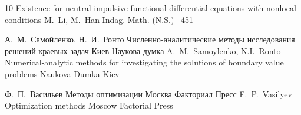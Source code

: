 \begin{thebibliography}{10}
\paper Existence for neutral impulsive functional differential equations with nonlocal conditions
\by   M.~Li,  M.~Han
\jour Indag. Math. (N.S.)
--451


\by А.~М.~Самойленко, Н.~И.~Ронто
\book Численно-аналитические методы исследования решений краевых задач
\publaddr Киев
\publ Наукова думка
\misctransl
\by A.~M.~Samoylenko, N.I.~Ronto
\book Numerical-analytic methods for investigating the solutions of boundary value problems
\publ Naukova Dumka
\publaddr Kiev

\by Ф.~П.~Васильев 
\book Методы оптимизации
\publaddr Москва
\publ Факториал Пресс
\misctransl
\by  F.~P.~Vasilyev  
\book Optimization methods
\publaddr Moscow
\publ Factorial Press

\end{thebibliography}



\noindent
\hskip6.5cm \thedate \par\noindent
\hskip6.5cm\therevdate

\newpage


\makeengtitlem




 \newpage
%
%
%
